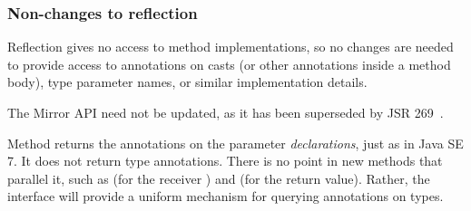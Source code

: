 \documentclass[10pt]{article}
\begin{document}
% 
% 
% 
% 



\subsubsection{Non-changes to reflection\label{non-changes-to-reflection}}

Reflection gives no access to method implementations, so no changes are
needed to
provide access to annotations on casts (or other annotations inside
a method body), type parameter names, or similar implementation details.


The Mirror API  need not be updated, as it has been
superseded by JSR 269~\cite{JSR269}.


Method  returns the annotations on
the parameter \emph{declarations}, just as in Java SE 7.  It does not return
type annotations.  There is no point in new methods that parallel it,
such as  (for the receiver
) and  (for the return
value).  Rather, the interface will provide a uniform mechanism for
querying annotations on types.
\end{document}
